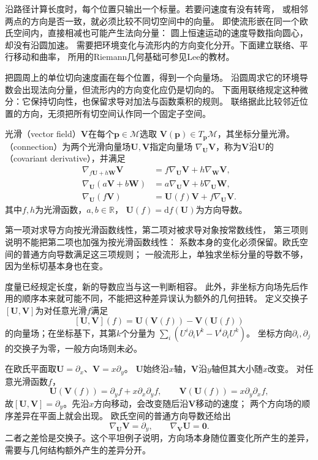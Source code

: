 \label{sec:geometry-cross-point-comparison-curvature}
\label{sec:geometry-parallel-transport}

沿路径计算长度时，每个位置只输出一个标量。若要问速度有没有转弯，
或相邻两点的方向是否一致，就必须比较不同切空间中的向量。
即使流形嵌在同一个欧氏空间内，直接相减也可能产生法向分量：
圆上恒速运动的速度导数指向圆心，却没有沿圆加速。
需要把环境变化与流形内的方向变化分开。下面建立联络、平行移动和曲率，
所用的Riemann几何基础可参见Lee的教材。


把圆周上的单位切向速度画在每个位置，得到一个向量场。
沿圆周求它的环境导数会出现法向分量，但流形内的方向变化应仍是切向的。
下面用联络规定这种微分：它保持切向性，也保留求导对加法与函数乘积的规则。
联络据此比较邻近位置的方向，无须把所有切空间认作同一个固定子空间。

\begin{definition}[向量场与联络]
\label{def:geometry-connection}
光滑（vector field）$\bm V$在每个$\bm p\in\mathcal M$选取
$\bm V(\bm p)\in T_{\bm p}\mathcal M$，其坐标分量光滑。
（connection）为两个光滑向量场$\bm U,\bm V$指定向量场
$\nabla_{\bm U}\bm V$，称为$\bm V$沿$\bm U$的
（covariant derivative），并满足
\[
 \begin{aligned}
 \nabla_{f\bm U+h\bm W}\bm V
   &=f\nabla_{\bm U}\bm V+h\nabla_{\bm W}\bm V,\\
 \nabla_{\bm U}(a\bm V+b\bm W)
   &=a\nabla_{\bm U}\bm V+b\nabla_{\bm U}\bm W,\\
 \nabla_{\bm U}(f\bm V)
   &=\bm U(f)\bm V+f\nabla_{\bm U}\bm V.
 \end{aligned}
\]
其中$f,h$为光滑函数，$a,b\in\mathbb R$，
$\bm U(f)=\mathrm df(\bm U)$为方向导数。
\end{definition}
第一项对求导方向按光滑函数线性，第二项对被求导对象按常数线性，
第三项则说明不能把第二项也加强为按光滑函数线性：
系数本身的变化必须保留。欧氏空间的普通方向导数满足这三项规则；
一般流形上，单独求坐标分量的导数不够，因为坐标切基本身也在变。

度量已经规定长度，新的导数应当与这一判断相容。
此外，非坐标方向场先后作用的顺序本来就可能不同，不能把这种差异误认为额外的几何扭转。
定义交换子$[\bm U,\bm V]$为对任意光滑$f$满足
\[
 [\bm U,\bm V](f)=\bm U(\bm V(f))-\bm V(\bm U(f))
\]
的向量场；在坐标基下，其第$k$个分量为
$\sum_i(U^i\partial_iV^k-V^i\partial_iU^k)$。
坐标方向$\partial_i,\partial_j$的交换子为零，一般方向场则未必。

\begin{example}[平面上不可交换的方向场]
\label{ex:geometry-plane-field-commutator}
在欧氏平面取$\bm U=\partial_x$、$\bm V=x\partial_y$。
$\bm U$始终沿$x$轴，$\bm V$沿$y$轴但其大小随$x$改变。
对任意光滑函数$f$，
\[
 \bm U(\bm V(f))=\partial_yf+x\partial_x\partial_yf,\qquad
 \bm V(\bm U(f))=x\partial_y\partial_xf,
\]
故$[\bm U,\bm V]=\partial_y$。先沿$x$方向移动，会改变随后沿$\bm V$移动的速度；
两个方向场的顺序差异在平面上就会出现。
欧氏空间的普通方向导数还给出
\[
 \nabla_{\bm U}\bm V=\partial_y,\qquad
 \nabla_{\bm V}\bm U=\bm0.
\]
二者之差恰是交换子。这个平坦例子说明，方向场本身随位置变化所产生的差异，
需要与几何结构额外产生的差异分开。
\end{example}

